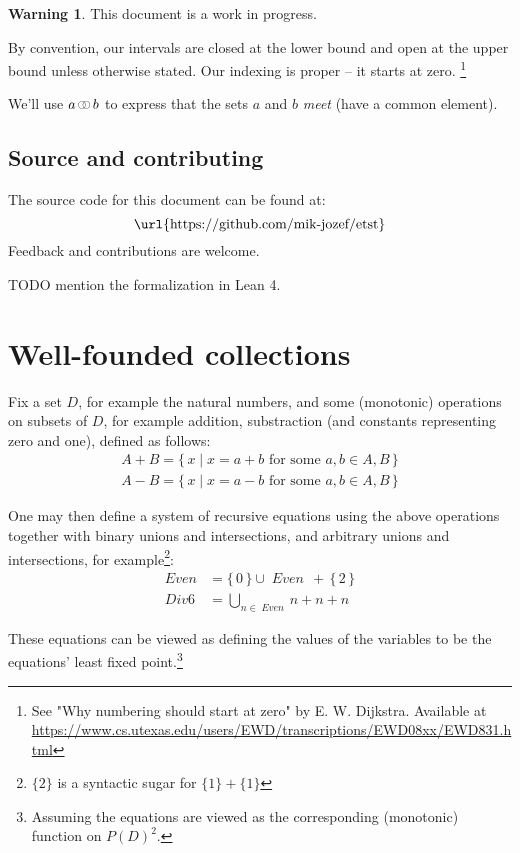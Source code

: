 \documentclass[oneside,12pt]{book}
\theoremstyle{definition}
\newtheorem*{warning}{Warning}
\theoremstyle{remark}
\newcommand\var[1]{\mathop{\mathit{#1}}\nolimits}
\newcommand{\pSet}{P}
\newcommand\Circle{\raisebox{0.45mm}{\scalebox{0.6}{$\bigcirc$}}}
\newcommand{\meet}{\var{\mathrlap{\Circle}\hspace{3.2pt}\Circle}}
\begin{document}
\begin{warning}
  This document is a work in progress.
\end{warning}

By convention, our intervals are closed at the lower bound and open at the upper
bound unless otherwise stated. Our indexing is proper -- it starts at zero.%
\footnote{See "Why numbering should start at zero" by E. W. Dijkstra. Available at
\url{https://www.cs.utexas.edu/users/EWD/transcriptions/EWD08xx/EWD831.html}}

We'll use $a \meet b$ to express that the sets $a$ and $b$ \textit{meet} (have
a common element).

\section{Source and contributing} \label{sectionSource}
The source code for this document can be found at:
\[\text{\url{https://github.com/mik-jozef/etst}}\]
Feedback and contributions are welcome.

TODO mention the formalization in Lean 4.



\chapter{Well-founded collections} \label{chapterWFC}
Fix a set $D$, for example the natural numbers, and some (monotonic) operations
on subsets of $D$, for example addition, substraction (and constants
representing zero and one), defined as follows:
%
\begin{gather*}
  A + B = \{\,x \mid x = a + b \text{ for some } a,b \in A,B\,\} \\
  A - B = \{\,x \mid x = a - b \text{ for some } a,b \in A,B\,\}
\end{gather*}

One may then define a system of recursive equations using the above operations
together with binary unions and intersections, and arbitrary unions and
intersections, for example\footnote{$\{ 2 \}$ is a syntactic sugar for
$\{ 1 \}+\{1\}$}:
%
\begin{align*}
  \var{Even} &= \{\,0\,\} \cup \var{Even}\,+\,\{\,2\,\} \\
  \var{Div6} &= \bigcup_{n \in \var{Even}}n + n + n
\end{align*}

These equations can be viewed as defining the values of the variables to be the
equations' least fixed point.\footnote{Assuming the equations are viewed as
the corresponding (monotonic) function on $\pSet(D)^2$.}
\end{document}

